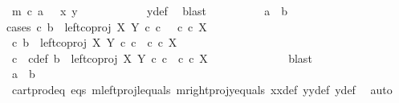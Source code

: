 \begin{isabellebody}
\ {\isachardoublequoteopen}m\ {\isasymcirc}\isactrlsub c\ a\ \ {\isacharequal}{\kern0pt}\ {\isasymlangle}x{}{\isacharcomma}{\kern0pt}\ y{}{\isasymrangle}{\isachardoublequoteclose}\isanewline
\ \ \ \ \ \ \ \ \ \ \isamarkupfalse%
\ y{\isacharunderscore}{\kern0pt}def\ \isamarkupfalse%
\ blast\isanewline
\ \ \ \ \ \ \ \ \isamarkupfalse%
\ {\isachardoublequoteopen}a\ {\isacharequal}{\kern0pt}\ b{\isachardoublequoteclose}\isanewline
\ \ \ \ \ \ \ \ \isamarkupfalse%
{\isacharparenleft}{\kern0pt}cases\ {\isachardoublequoteopen}{\isasymexists}c{\isachardot}{\kern0pt}\ b\ {\isacharequal}{\kern0pt}\ left{\isacharunderscore}{\kern0pt}coproj\ X\ Y\ {\isasymcirc}\isactrlsub c\ c\ \ {\isasymand}\ c\ {\isasymin}\isactrlsub c\ X{\isachardoublequoteclose}{\isacharparenright}{\kern0pt}\isanewline
\ \ \ \ \ \ \ \ \ \ \isamarkupfalse%
\ {\isachardoublequoteopen}{\isasymexists}c{\isachardot}{\kern0pt}\ b\ {\isacharequal}{\kern0pt}\ left{\isacharunderscore}{\kern0pt}coproj\ X\ Y\ {\isasymcirc}\isactrlsub c\ c\ {\isasymand}\ c\ {\isasymin}\isactrlsub c\ X{\isachardoublequoteclose}\isanewline
\ \ \ \ \ \ \ \ \ \ \isamarkupfalse%
\ \isamarkupfalse%
\ c\ \ c{\isacharunderscore}{\kern0pt}def{\isacharcolon}{\kern0pt}\ {\isachardoublequoteopen}b\ {\isacharequal}{\kern0pt}\ left{\isacharunderscore}{\kern0pt}coproj\ X\ Y\ {\isasymcirc}\isactrlsub c\ c\ {\isasymand}\ c\ {\isasymin}\isactrlsub c\ X{\isachardoublequoteclose}\isanewline
\ \ \ \ \ \ \ \ \ \ \ \ \isamarkupfalse%
\ blast\isanewline
\ \ \ \ \ \ \ \ \ \ \isamarkupfalse%
\ \isamarkupfalse%
\ {\isachardoublequoteopen}a\ {\isacharequal}{\kern0pt}\ b{\isachardoublequoteclose}\isanewline
\ \ \ \ \ \ \ \ \ \ \ \ \isamarkupfalse%
\ cart{\isacharunderscore}{\kern0pt}prod{\isacharunderscore}{\kern0pt}eq{}\ eqs\ m{\isacharunderscore}{\kern0pt}leftproj{\isacharunderscore}{\kern0pt}l{\isacharunderscore}{\kern0pt}equals\ m{\isacharunderscore}{\kern0pt}rightproj{\isacharunderscore}{\kern0pt}y{\isacharunderscore}{\kern0pt}equals\ x{}x{}{\isacharunderscore}{\kern0pt}def{\isacharparenleft}{\kern0pt}{}{\isacharparenright}{\kern0pt}\ y{}y{}{\isacharunderscore}{\kern0pt}def\ y{\isacharunderscore}{\kern0pt}def\ \isamarkupfalse%
\ auto\isanewline
\ \ \ \ \ \ \ \ \isamarkupfalse%
\isanewline
\ \ \ \ \ \ \ \ \ \ \isamarkupfalse%

\end{isabellebody}
